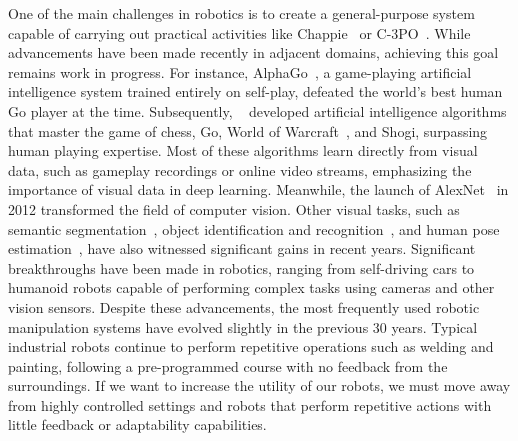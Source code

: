 One of the main challenges in robotics is to create a general-purpose system capable of carrying out practical activities like Chappie~\cite{blomkamp2015chappie} or C-3PO~\cite{lucas1977star}. 
While advancements have been made recently in adjacent domains, achieving this goal remains work in progress. 
For instance, AlphaGo~\cite{silver2018general}, a game-playing artificial intelligence system trained entirely on self-play, defeated the world's best human Go player at the time. 
Subsequently, \citeauthor{silver2016mastering}~\cite{silver2016mastering} developed artificial intelligence algorithms that master the game of chess, Go, World of Warcraft~\cite{entertainment2013world}, and Shogi, surpassing human playing expertise. 
Most of these algorithms learn directly from visual data, such as gameplay recordings or online video streams, emphasizing the importance of visual data in deep learning. 
Meanwhile, the launch of AlexNet~\cite{krizhevsky2017imagenet} in 2012 transformed the field of computer vision. 
Other visual tasks, such as semantic segmentation~\cite{long2015fully}, object identification and recognition~\cite{he2017mask}, and human pose estimation~\cite{guler2018densepose}, have also witnessed significant gains in recent years. 
Significant breakthroughs have been made in robotics, ranging from self-driving cars to humanoid robots capable of performing complex tasks using cameras and other vision sensors. 
Despite these advancements, the most frequently used robotic manipulation systems have evolved slightly in the previous 30 years. 
Typical industrial robots continue to perform repetitive operations such as welding and painting, following a pre-programmed course with no feedback from the surroundings. 
If we want to increase the utility of our robots, we must move away from highly controlled settings and robots that perform repetitive actions with little feedback or adaptability capabilities. 

